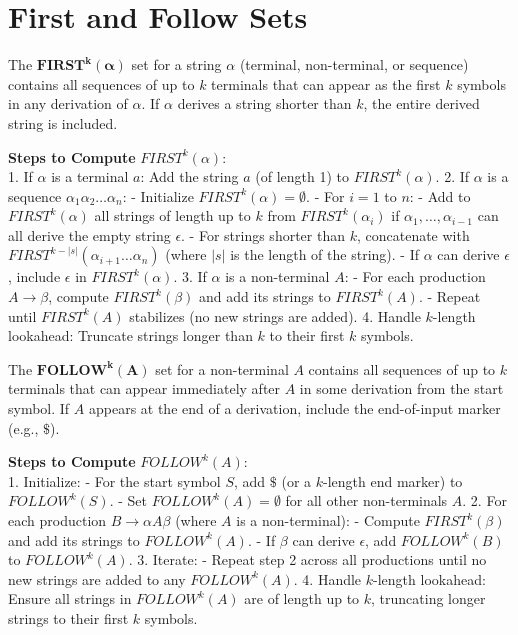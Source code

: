 \section{First and Follow Sets}

The $\mathbf{FIRST^k(\alpha)}$ set for a string $\alpha$ (terminal, non-terminal, or sequence) contains all sequences of up to $k$ terminals that can appear as the first $k$ symbols in any derivation of $\alpha$. If $\alpha$ derives a string shorter than $k$, the entire derived string is included.

\textbf{Steps to Compute} $FIRST^k(\alpha)$:\\
1. If $\alpha$ is a terminal $a$: Add the string $a$ (of length 1) to $FIRST^k(\alpha)$.
2. If $\alpha$ is a sequence $\alpha_1 \alpha_2 \dots \alpha_n$:
   - Initialize $FIRST^k(\alpha) = \emptyset$.
   - For $i = 1$ to $n$:
     - Add to $FIRST^k(\alpha)$ all strings of length up to $k$ from $FIRST^k(\alpha_i)$ if $\alpha_1, \dots, \alpha_{i-1}$ can all derive the empty string $\epsilon$.
     - For strings shorter than $k$, concatenate with $FIRST^{k-|s|}(\alpha_{i+1} \dots \alpha_n)$ (where $|s|$ is the length of the string).
   - If $\alpha$ can derive $\epsilon$, include $\epsilon$ in $FIRST^k(\alpha)$.
3. If $\alpha$ is a non-terminal $A$:
   - For each production $A \to \beta$, compute $FIRST^k(\beta)$ and add its strings to $FIRST^k(A)$.
   - Repeat until $FIRST^k(A)$ stabilizes (no new strings are added).
4. Handle $k$-length lookahead: Truncate strings longer than $k$ to their first $k$ symbols.

The $\mathbf{FOLLOW^k(A)}$ set for a non-terminal $A$ contains all sequences of up to $k$ terminals that can appear immediately after $A$ in some derivation from the start symbol. If $A$ appears at the end of a derivation, include the end-of-input marker (e.g., $\$$).

\textbf{Steps to Compute} $FOLLOW^k(A)$:\\
1. Initialize:
   - For the start symbol $S$, add $\$$ (or a $k$-length end marker) to $FOLLOW^k(S)$.
   - Set $FOLLOW^k(A) = \emptyset$ for all other non-terminals $A$.
2. For each production $B \to \alpha A \beta$ (where $A$ is a non-terminal):
   - Compute $FIRST^k(\beta)$ and add its strings to $FOLLOW^k(A)$.
   - If $\beta$ can derive $\epsilon$, add $FOLLOW^k(B)$ to $FOLLOW^k(A)$.
3. Iterate:
   - Repeat step 2 across all productions until no new strings are added to any $FOLLOW^k(A)$.
4. Handle $k$-length lookahead: Ensure all strings in $FOLLOW^k(A)$ are of length up to $k$, truncating longer strings to their first $k$ symbols.



